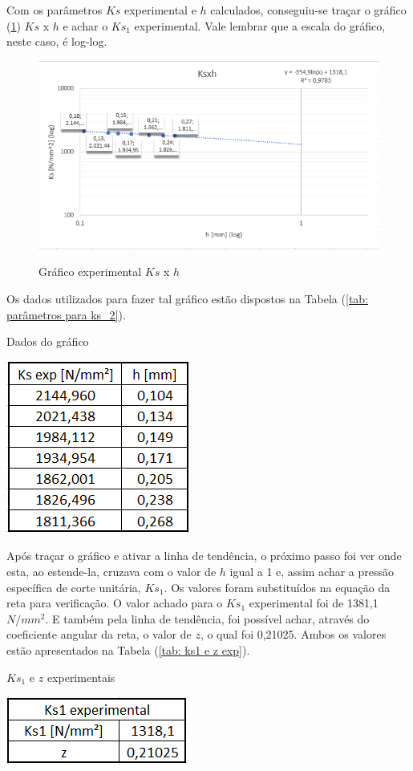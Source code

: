 \documentclass[deposito, acronym, symbols]{fei}
\begin{document}
Com os parâmetros $Ks$ experimental e $h$  calculados, conseguiu-se traçar o gráfico (\ref{fig: grafico}) $Ks$ x $h$ e achar o $Ks_1$ experimental. Vale lembrar que a escala do gráfico, neste caso, é log-log.


\begin{figure}[!htp]
    \centering
    \caption{Gráfico experimental $Ks$ x $h$}
    \includegraphics[width=0.6\linewidth]{Imagens/Gráfico Ksxh.png}
    \label{fig: grafico}
\end{figure}

 Os dados utilizados para fazer tal gráfico estão dispostos na Tabela (\ref{tab: parâmetros para ks_2}).
 
\begin{table}[!htb]
 \centering
    \caption{Dados do gráfico}
    \includegraphics[width=0.3\linewidth]{Imagens/tabela ks1.png}
    \label{tab: parâmetros para ks_2}
 \end{table}

Após traçar o gráfico e ativar a linha de tendência, o próximo passo foi ver onde esta, ao estende-la, cruzava com o valor de $h$ igual a 1 e, assim achar a pressão específica de corte unitária, $Ks_1$. Os valores foram substituídos na equação da reta para verificação. O valor achado para o $Ks_1$ experimental foi de 1381,1 $N/mm^2$. E também pela linha de tendência, foi possível achar, através do coeficiente angular da reta, o valor de $z$, o qual foi 0,21025. Ambos os valores estão apresentados na Tabela (\ref{tab: ks1 e z exp}).

 \begin{table}[!htb]
 \centering
    \caption{$Ks_1$ e $z$ experimentais}
    \includegraphics[width=0.3\linewidth]{Imagens/ks1 e z experiemnta.png}
    \label{tab: ks1 e z exp}
 \end{table}
 
\end{document}
